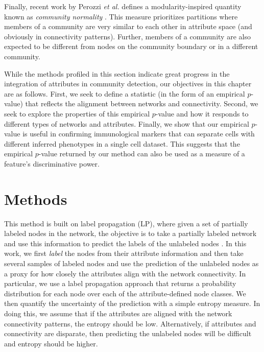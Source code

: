 Finally, recent work by Perozzi \emph{et al.} defines a modularity-inspired quantity known as \emph{community normality} \cite{perozziAttribute}. This measure prioritizes partitions where members of a community are very similar to each other in attribute space (and obviously in connectivity patterns). Further, members of a community are also expected to be different from nodes on the community boundary or in a different community. 

While the methods profiled in this section indicate great progress in the integration of attributes in community detection, our objectives in this chapter are as follows. First, we seek to define a statistic (in the form of an empirical $p$-value) that reflects the alignment between networks and connectivity. Second, we seek to explore the properties of this empirical $p$-value and how it responds to different types of networks and attributes. Finally, we show that our empirical $p$-value is useful in confirming immunological markers that can separate cells with different inferred phenotypes in a single cell dataset. This suggests that the empirical $p$-value returned by our method can also be used as a measure of a feature's discriminative power. 

\section{Methods}
This method is built on label propagation (LP), where given a set of partially labeled nodes in the network, the objective is to take a partially labeled network and use this information to predict the labels of the unlabeled nodes \cite{LabProp}. In this work, we first \emph{label} the nodes from their attribute information and then take several samples of labeled nodes and use the prediction of the unlabeled nodes as a proxy for how closely the attributes align with the network connectivity. In particular, we use a label propagation approach that returns a probability distribution for each node over each of the attribute-defined node classes. We then quantify the uncertainty of the prediction with a simple entropy measure. In doing this, we assume that if the attributes are aligned with the network connectivity patterns, the entropy should be low. Alternatively, if attributes and connectivity are disparate, then predicting the unlabeled nodes will be difficult and entropy should be higher. 

